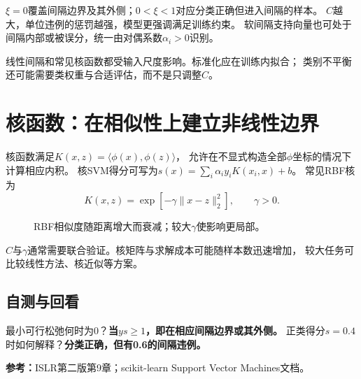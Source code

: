$\xi=0$覆盖间隔边界及其外侧；$0<\xi<1$对应分类正确但进入间隔的样本。
$C$越大，单位违例的惩罚越强，模型更强调满足训练约束。
软间隔支持向量也可处于间隔内部或被误分，统一由对偶系数$\alpha_i>0$识别。

\begin{pitfall}[尺度会改变几何含义]
线性间隔和常见核函数都受输入尺度影响。标准化应在训练内拟合；
类别不平衡还可能需要类权重与合适评估，而不是只调整$C$。
\end{pitfall}

\section{核函数：在相似性上建立非线性边界}
\label{sec:svm-kernel}
核函数满足$K(x,z)=\langle\phi(x),\phi(z)\rangle$，
允许在不显式构造全部$\phi$坐标的情况下计算相应内积。
核SVM得分可写为$s(x)=\sum_i\alpha_i y_iK(x_i,x)+b$。
常见RBF核为
\[
 K(x,z)=\exp[-\gamma\lVert x-z\rVert_2^2],\qquad\gamma>0.
\]

\begin{figure}[htbp]
\centering
\caption{RBF相似度随距离增大而衰减；较大$\gamma$使影响更局部。}
\par\smallskip
{}
\end{figure}

$C$与$\gamma$通常需要联合验证。核矩阵与求解成本可能随样本数迅速增加，
较大任务可比较线性方法、核近似等方案。

\subsection{自测与回看}
最小可行松弛何时为0？\textbf{当$ys\geq1$，即在相应间隔边界或其外侧。}
正类得分$s=0.4$时如何解释？\textbf{分类正确，但有0.6的间隔违例。}

\begingroup\small
\noindent\textbf{参考：}ISLR第二版第9章；scikit-learn Support Vector Machines文档。
\par\endgroup
